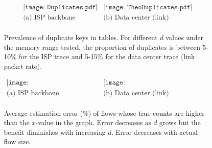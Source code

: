 
\begin{figure}
  \centering
  \[
  \begin{array}{ccc}
	\texttt{[image: Duplicates.pdf]} &
	\texttt{[image: TheoDuplicates.pdf]}
    \\
    \mbox{(a) ISP backbone} & \mbox{(b) Data center (link)} \\
  \end{array}
  \]
\caption{Prevalence of duplicate keys in tables. For different $d$ values under
  the memory range tested, the proportion of duplicates is between 5-10\% for
  the ISP trace and 5-15\% for the data center trace (link packet rate).}
\label{fig:duplicates}
\end{figure}




\begin{figure}
  \centering
  \[
  \begin{array}{ccc}
	\texttt{[image: DsRelativeErrorAlt.pdf]} &
	\texttt{[image: TheoDsRelativeErrorAlt.pdf]}
    \\
    \mbox{(a) ISP backbone} & \mbox{(b) Data center (link)} \\
  \end{array}
  \]
\caption{Average estimation error (\%) of flows whose true counts are higher
  than the $x$-value in the graph. Error decreases as $d$ grows but the benefit
  diminishes with increasing $d$. Error decreases with actual flow size.}
\label{fig:estimation-error-D}
\end{figure}

